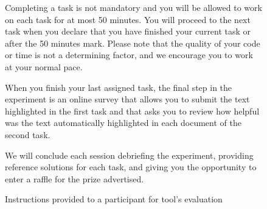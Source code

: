 \begin{figure}
\begin{mdframed}[backgroundcolor=gray!04]
\begin{footnotesize}
Completing a task is not mandatory and you will be allowed to work on each task for at most 50 minutes. You will proceed to the next task when you declare that you have finished your current task or after the 50 minutes mark. Please note that the quality of your code or time is not a determining factor, and we encourage you to work at your normal pace.  \medskip

When you finish your last assigned task, the final step in the experiment is an online survey that allows you to submit the text highlighted in the first task and that asks you to review how helpful was the text automatically highlighted in each document of the second task. \medskip

We will conclude each session debriefing the experiment, providing reference solutions for each task, and giving you the opportunity to enter a raffle for the prize advertised.




\end{footnotesize}
\end{mdframed}
\caption{Instructions provided to a participant for \acs{tool}'s evaluation}
\end{figure}

\vfill
